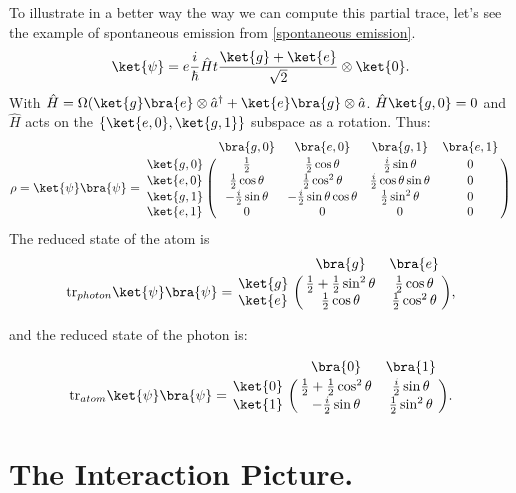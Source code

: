 \begin{appendix}
To illustrate in a better way the way we can compute this partial trace, let's see the example of spontaneous emission from \ref{spontaneous emission}.
\[
\ket{\psi}=e{\frac{i}{\hbar}\hat{H}t}\frac{\ket{g}+\ket{e}}{\sqrt{2}}\otimes\ket{0}.
\]
With $\hat{H}=\Omega(\ket{g}\bra{e}\otimes\hat{a}^{\dagger}+\ket{e}\bra{g}\otimes\hat{a}$. $\hat{H}\ket{g,0}=0$ and $\hat{H}$ acts on the $\{\ket{e,0},\ket{g,1}\}$ subspace as a rotation. Thus:
\[
\rho=\ket{\psi}\bra{\psi}=\bordermatrix{~&\bra{g,0}&\bra{e,0}&\bra{g,1}&\bra{e,1}\cr
			\ket{g,0}&\frac{1}{2} & \frac{1}{2}\cos\theta & \frac{i}{2}\sin\theta & 0\cr
			\ket{e,0}&\frac{1}{2}\cos\theta & \frac{1}{2}\cos^2\theta & \frac{i}{2}\cos\theta\sin\theta & 0\cr
			\ket{g,1}&-\frac{i}{2}\sin\theta & -\frac{i}{2}\sin\theta\cos\theta & \frac{1}{2}\sin^2\theta & 0\cr
			\ket{e,1}&0 & 0 & 0 & 0\cr}
\]
The reduced state of the atom is
\[
\text{tr}_{photon}\ket{\psi}\bra{\psi}=
\bordermatrix{~&\bra{g}&\bra{e}\cr
			\ket{g}&\frac{1}{2}+\frac{1}{2}\sin^2\theta & \frac{1}{2}\cos\theta\cr
			\ket{e}&\frac{1}{2}\cos\theta & \frac{1}{2}\cos^2\theta\cr},
\]

and the reduced state of the photon is:

\[
\text{tr}_{atom}\ket{\psi}\bra{\psi}=\bordermatrix{~&\bra{0}&\bra{1}\cr
			\ket{0}&\frac{1}{2}+\frac{1}{2}\cos^2\theta & \frac{i}{2}\sin\theta\cr
			\ket{1}&-\frac{i}{2}\sin\theta & \frac{1}{2}\sin^2\theta\cr}.
\]
\chapter{The Interaction Picture.}\label{appendixBinteractionpicture}


\end{appendix}
